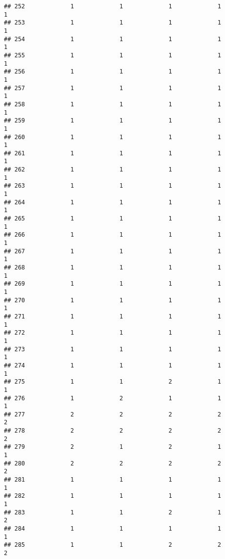 \documentclass[
]{article}
\begin{document}
\begin{verbatim}
## 252             1             1             1             1             1
## 253             1             1             1             1             1
## 254             1             1             1             1             1
## 255             1             1             1             1             1
## 256             1             1             1             1             1
## 257             1             1             1             1             1
## 258             1             1             1             1             1
## 259             1             1             1             1             1
## 260             1             1             1             1             1
## 261             1             1             1             1             1
## 262             1             1             1             1             1
## 263             1             1             1             1             1
## 264             1             1             1             1             1
## 265             1             1             1             1             1
## 266             1             1             1             1             1
## 267             1             1             1             1             1
## 268             1             1             1             1             1
## 269             1             1             1             1             1
## 270             1             1             1             1             1
## 271             1             1             1             1             1
## 272             1             1             1             1             1
## 273             1             1             1             1             1
## 274             1             1             1             1             1
## 275             1             1             2             1             1
## 276             1             2             1             1             1
## 277             2             2             2             2             2
## 278             2             2             2             2             2
## 279             2             1             2             1             1
## 280             2             2             2             2             2
## 281             1             1             1             1             1
## 282             1             1             1             1             1
## 283             1             1             2             1             2
## 284             1             1             1             1             1
## 285             1             1             2             2             2

\end{verbatim}
\end{document}
